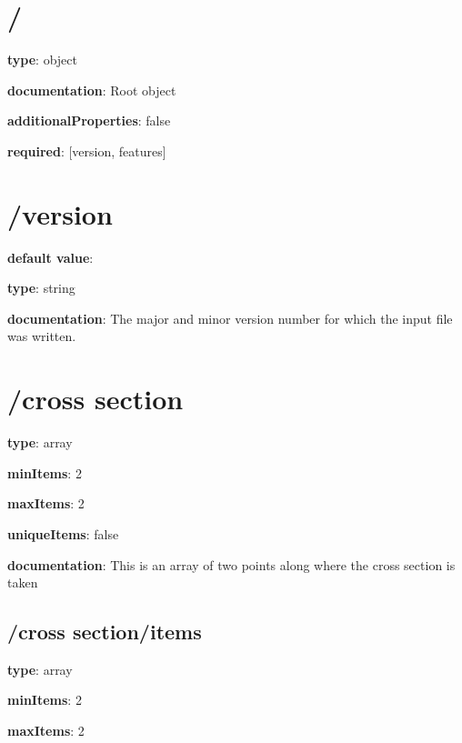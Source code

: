 \section{/} \begin{itemized}
\item {\bf type}: object
\item {\bf documentation}: Root object
\item {\bf additionalProperties}: false
\item {\bf required}: [version, features]\end{itemized}
\section{/version} \begin{itemized}
\item {\bf default value}: 
\item {\bf type}: string
\item {\bf documentation}: The major and minor version number for which the input file was written.
\end{itemized}\section{/cross section} \begin{itemized}
\item {\bf type}: array
\item {\bf minItems}: 2
\item {\bf maxItems}: 2
\item {\bf uniqueItems}: false
\item {\bf documentation}: This is an array of two points along where the cross section is taken
\subsection{/cross section/items} \begin{itemized}
\item {\bf type}: array
\item {\bf minItems}: 2
\item {\bf maxItems}: 2

\end{itemized}
\end{itemized}
